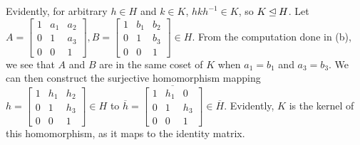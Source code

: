 \documentclass{article}
\begin{document}
Evidently, for arbitrary $h \in H$ and $k \in K$, $hkh^{-1} \in K$, so $K \unlhd H$.
Let $A = \begin{bmatrix} 1 & a_1 & a_2 \\ 0 & 1 & a_3 \\ 0 & 0 & 1\end{bmatrix}, B = \begin{bmatrix} 1 & b_1 & b_2 \\ 0 & 1 & b_3 \\ 0 & 0 & 1\end{bmatrix} \in H$. From the computation done in (b), we see that $A$ and $B$ are in the same coset of $K$ when $a_1 = b_1$ and $a_3 = b_3$. We can then construct the surjective homomorphism mapping $h = \begin{bmatrix} 1 & h_1 & h_2 \\ 0 & 1 & h_3 \\ 0 & 0 & 1\end{bmatrix} \in H$ to $\overline{h} = \overline{\begin{bmatrix} 1 & h_1 & 0 \\ 0 & 1 & h_3 \\ 0 & 0 & 1\end{bmatrix}} \in \overline{H}$. Evidently, $K$ is the kernel of this homomorphism, as it maps to the identity matrix.

\clearpage
\end{document}
